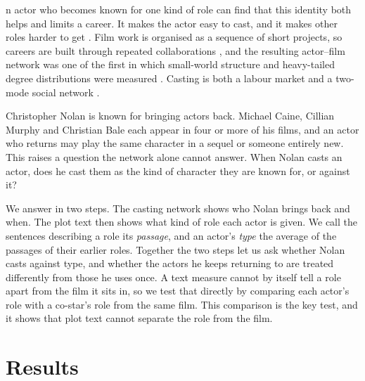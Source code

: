 \documentclass[9pt,twocolumn,twoside]{pnas-new}
\begin{document}

\maketitle
\thispagestyle{firststyle}

\Firstpage

n actor who becomes known for one kind of role can find that this identity both helps and limits a career. It makes the actor easy to cast, and it makes other roles harder to get \cite{article_typecast}. Film work is organised as a sequence of short projects, so careers are built through repeated collaborations \cite{faulkner1987}, and the resulting actor--film network was one of the first in which small-world structure and heavy-tailed degree distributions were measured \cite{watts1998,barabasi1999}. Casting is both a labour market and a two-mode social network \cite{borgatti1997}.

Christopher Nolan is known for bringing actors back. Michael Caine, Cillian Murphy and Christian Bale each appear in four or more of his films, and an actor who returns may play the same character in a sequel or someone entirely new. This raises a question the network alone cannot answer. When Nolan casts an actor, does he cast them as the kind of character they are known for, or against it?

We answer in two steps. The casting network shows who Nolan brings back and when. The plot text then shows what kind of role each actor is given. We call the sentences describing a role its \emph{passage}, and an actor's \emph{type} the average of the passages of their earlier roles. Together the two steps let us ask whether Nolan casts against type, and whether the actors he keeps returning to are treated differently from those he uses once. A text measure cannot by itself tell a role apart from the film it sits in, so we test that directly by comparing each actor's role with a co-star's role from the same film. This comparison is the key test, and it shows that plot text cannot separate the role from the film.

\section*{Results}
\end{document}
